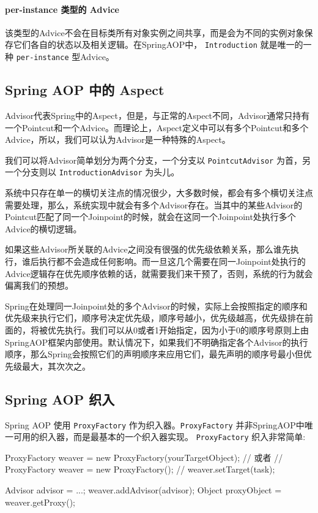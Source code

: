 \paragraph*{per-instance 类型的 Advice} 该类型的Advice不会在目标类所有对象实例之间共享，而是会为不同的实例对象保存它们各自的状态以及相关逻辑。在SpringAOP中， \texttt{Introduction} 就是唯一的一种 \texttt{per-instance} 型Advice。

\subsection{Spring AOP 中的 Aspect}

Advisor代表Spring中的Aspect，但是，与正常的Aspect不同，Advisor通常只持有一个Pointcut和一个Advice。而理论上，Aspect定义中可以有多个Pointcut和多个Advice，所以，我们可以认为Advisor是一种特殊的Aspect。

我们可以将Advisor简单划分为两个分支，一个分支以 \texttt{PointcutAdvisor} 为首，另一个分支则以 \texttt{IntroductionAdvisor} 为头儿。

系统中只存在单一的横切关注点的情况很少，大多数时候，都会有多个横切关注点需要处理，那么，系统实现中就会有多个Advisor存在。当其中的某些Advisor的Pointcut匹配了同一个Joinpoint的时候，就会在这同一个Joinpoint处执行多个Advice的横切逻辑。

如果这些Advisor所关联的Advice之间没有很强的优先级依赖关系，那么谁先执行，谁后执行都不会造成任何影响。而一旦这几个需要在同一Joinpoint处执行的Advice逻辑存在优先顺序依赖的话，就需要我们来干预了，否则，系统的行为就会偏离我们的预想。

Spring在处理同一Joinpoint处的多个Advisor的时候，实际上会按照指定的顺序和优先级来执行它们，顺序号决定优先级，顺序号越小，优先级越高，优先级排在前面的，将被优先执行。我们可以从0或者1开始指定，因为小于0的顺序号原则上由SpringAOP框架内部使用。默认情况下，如果我们不明确指定各个Advisor的执行顺序，那么Spring会按照它们的声明顺序来应用它们，最先声明的顺序号最小但优先级最大，其次次之。

\subsection{Spring AOP 织入}

Spring AOP 使用 \texttt{ProxyFactory} 作为织入器。\texttt{ProxyFactory} 并非SpringAOP中唯一可用的织入器，而是最基本的一个织入器实现。 \texttt{ProxyFactory} 织入非常简单:

\begin{Java}
ProxyFactory weaver = new ProxyFactory(yourTargetObject);
// 或者
// ProxyFactory weaver = new ProxyFactory();
// weaver.setTarget(task);

Advisor advisor = ...;
weaver.addAdvisor(advisor);
Object proxyObject = weaver.getProxy();
\end{Java}

\newpage